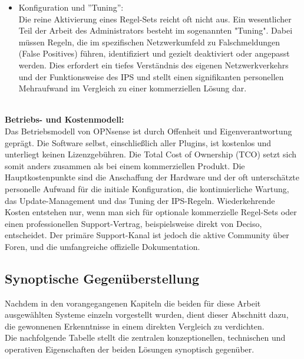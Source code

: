 \begin{itemize}
	\item Konfiguration und ''Tuning'': \\Die reine Aktivierung eines Regel-Sets reicht oft nicht aus. Ein wesentlicher Teil der Arbeit des Administrators besteht im sogenannten "Tuning". Dabei müssen Regeln, die im spezifischen Netzwerkumfeld zu Falschmeldungen (False Positives) führen, identifiziert und gezielt deaktiviert oder angepasst werden. Dies erfordert ein tiefes Verständnis des eigenen Netzwerkverkehrs und der Funktionsweise des IPS und stellt einen signifikanten personellen Mehraufwand im Vergleich zu einer kommerziellen Lösung dar.\\\\
\end{itemize}
\textbf{Betriebs- und Kostenmodell:}\\
Das Betriebsmodell von OPNsense ist durch Offenheit und Eigenverantwortung geprägt. Die Software selbst, einschließlich aller Plugins, ist kostenlos und unterliegt keinen Lizenzgebühren. Die Total Cost of Ownership (TCO) setzt sich somit anders zusammen als bei einem kommerziellen Produkt. Die Hauptkostenpunkte sind die Anschaffung der Hardware und der oft unterschätzte personelle Aufwand für die initiale Konfiguration, die kontinuierliche Wartung, das Update-Management und das Tuning der IPS-Regeln. Wiederkehrende Kosten entstehen nur, wenn man sich für optionale kommerzielle Regel-Sets oder einen professionellen Support-Vertrag, beispielsweise direkt von Deciso, entscheidet. Der primäre Support-Kanal ist jedoch die aktive Community über Foren, und die umfangreiche offizielle Dokumentation.
\newpage

\subsection{Synoptische Gegenüberstellung}
Nachdem in den vorangegangenen Kapiteln die beiden für diese Arbeit ausgewählten Systeme einzeln vorgestellt wurden, dient dieser Abschnitt dazu, die gewonnenen Erkenntnisse in einem direkten Vergleich zu verdichten.\\
Die nachfolgende Tabelle stellt die zentralen konzeptionellen, technischen und operativen Eigenschaften der beiden Lösungen synoptisch gegenüber.\\

